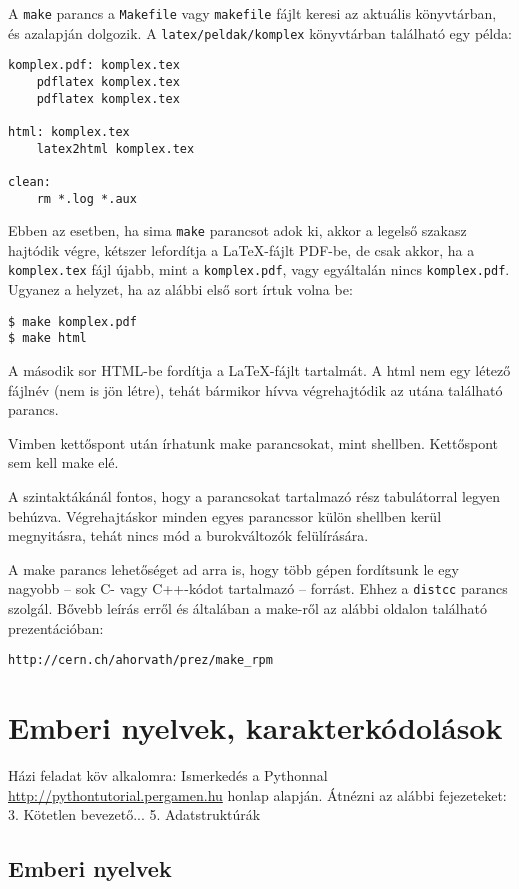\documentclass[a4paper]{article}
\begin{document}
A \texttt{make} parancs a \texttt{Makefile} vagy \texttt{makefile} fájlt
keresi az aktuális könyvtárban, és azalapján dolgozik.  A
\texttt{latex/peldak/komplex} könyvtárban található egy példa:
\begin{Verbatim}[label=\fbox{Makefile}, frame=single]
komplex.pdf: komplex.tex
	pdflatex komplex.tex
	pdflatex komplex.tex

html: komplex.tex
	latex2html komplex.tex

clean:
	rm *.log *.aux
\end{Verbatim}

Ebben az esetben, ha sima \texttt{make} parancsot adok ki, akkor a
legelső szakasz hajtódik végre, kétszer lefordítja a \LaTeX-fájlt
PDF-be, de csak akkor, ha a \texttt{komplex.tex} fájl újabb, mint a
\texttt{komplex.pdf},
vagy egyáltalán nincs \texttt{komplex.pdf}.
Ugyanez a helyzet, ha az alábbi első sort írtuk volna be:
\begin{Verbatim}
$ make komplex.pdf
$ make html
\end{Verbatim}
A második sor HTML-be fordítja a \LaTeX-fájlt tartalmát. A html nem egy
létező fájlnév (nem is jön létre), tehát bármikor hívva végrehajtódik az
utána található parancs.

Vimben kettőspont után írhatunk make parancsokat, mint shellben.
Kettőspont sem kell make elé.

A szintaktákánál fontos, hogy a parancsokat tartalmazó rész tabulátorral
legyen behúzva. Végrehajtáskor minden egyes parancssor külön shellben kerül
megnyitásra, tehát nincs mód a burokváltozók felülírására.

A make parancs lehetőséget ad arra is, hogy több gépen fordítsunk le egy
nagyobb -- sok C- vagy C++-kódot tartalmazó -- forrást. Ehhez a
\texttt{distcc} parancs szolgál.
Bővebb leírás erről és általában a make-ről az alábbi oldalon található
prezentációban:
\begin{Verbatim}
http://cern.ch/ahorvath/prez/make_rpm
\end{Verbatim}

\newpage
\section{Emberi nyelvek, karakterkódolások}

Házi feladat köv alkalomra: Ismerkedés a Pythonnal
\url{http://pythontutorial.pergamen.hu} honlap alapján. Átnézni az alábbi
fejezeteket: 3. Kötetlen bevezető... 5.  Adatstruktúrák

\subsection{Emberi nyelvek}
\end{document}
